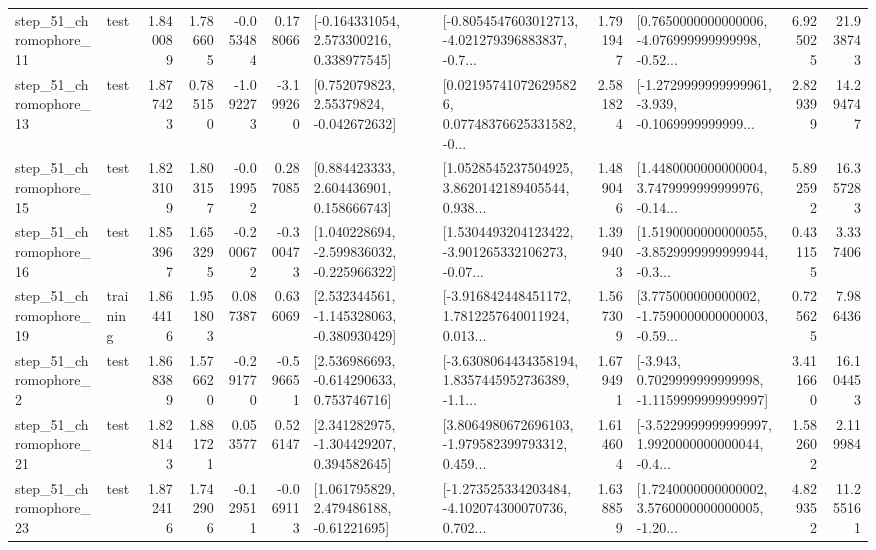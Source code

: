 \begin{tabular}{llrrrrllrlrr}
   step\_51\_chromophore\_11 &      test &      1.840089 &    1.786605 &     -0.053484 &  0.178066 &    [-0.164331054, 2.573300216, 0.338977545] &  [-0.8054547603012713, -4.021279396883837, -0.7... &       1.791947 &  [0.7650000000000006, -4.076999999999998, -0.52... &            6.925025 &         21.938743 \\
   step\_51\_chromophore\_13 &      test &      1.877423 &    0.785150 &     -1.092273 & -3.199260 &     [0.752079823, 2.55379824, -0.042672632] &  [0.021957410726295826, 0.07748376625331582, -0... &       2.581824 &  [-1.2729999999999961, -3.939, -0.1069999999999... &            2.829399 &         14.294747 \\
   step\_51\_chromophore\_15 &      test &      1.823109 &    1.803157 &     -0.019952 &  0.287085 &     [0.884423333, 2.604436901, 0.158666743] &  [1.0528545237504925, 3.8620142189405544, 0.938... &       1.489046 &  [1.4480000000000004, 3.7479999999999976, -0.14... &            5.892592 &         16.357283 \\
   step\_51\_chromophore\_16 &      test &      1.853967 &    1.653295 &     -0.200672 & -0.300473 &   [1.040228694, -2.599836032, -0.225966322] &  [1.5304493204123422, -3.901265332106273, -0.07... &       1.399403 &  [1.5190000000000055, -3.8529999999999944, -0.3... &            0.431155 &          3.337406 \\
   step\_51\_chromophore\_19 &  training &      1.864416 &    1.951803 &      0.087387 &  0.636069 &   [2.532344561, -1.145328063, -0.380930429] &  [-3.916842448451172, 1.7812257640011924, 0.013... &       1.567309 &  [3.775000000000002, -1.7590000000000003, -0.59... &            0.725625 &          7.986436 \\
    step\_51\_chromophore\_2 &      test &      1.868389 &    1.576620 &     -0.291770 & -0.596651 &    [2.536986693, -0.614290633, 0.753746716] &  [-3.6308064434358194, 1.8357445952736389, -1.1... &       1.679491 &  [-3.943, 0.7029999999999998, -1.1159999999999997] &            3.411660 &         16.104453 \\
   step\_51\_chromophore\_21 &      test &      1.828143 &    1.881721 &      0.053577 &  0.526147 &    [2.341282975, -1.304429207, 0.394582645] &  [3.8064980672696103, -1.979582399793312, 0.459... &       1.614604 &  [-3.5229999999999997, 1.9920000000000044, -0.4... &            1.582602 &          2.119984 \\
   step\_51\_chromophore\_23 &      test &      1.872416 &    1.742906 &     -0.129511 & -0.069113 &     [1.061795829, 2.479486188, -0.61221695] &  [-1.273525334203484, -4.102074300070736, 0.702... &       1.638859 &  [1.7240000000000002, 3.5760000000000005, -1.20... &            4.829352 &         11.255161 \\

\end{tabular}
